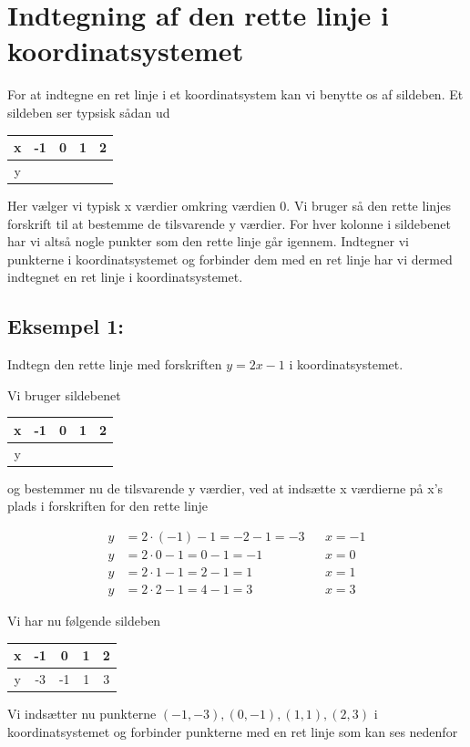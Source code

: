 \section*{Indtegning af den rette linje i koordinatsystemet}

For at indtegne en ret linje i et koordinatsystem kan vi benytte os af sildeben. Et sildeben ser typsisk sådan ud

\begin{tabular}{c|c|c|c|c}
x & -1 & 0 & 1 & 2 \\\hline
y &  & &   &  
\end{tabular}

Her vælger vi typisk x værdier omkring værdien 0. Vi bruger så den rette linjes forskrift til at bestemme de tilsvarende y værdier. For hver kolonne i sildebenet har vi altså nogle punkter som den rette linje går igennem. Indtegner vi punkterne i koordinatsystemet og forbinder dem med en ret linje har vi dermed indtegnet en ret linje i koordinatsystemet.

\subsection*{Eksempel 1:}

Indtegn den rette linje med forskriften $y = 2x - 1$ i koordinatsystemet.

Vi bruger sildebenet \begin{tabular}{c|c|c|c|c}
x & -1 & 0 & 1 & 2 \\\hline
y &  & &   &  
\end{tabular}

og bestemmer nu de tilsvarende y værdier, ved at indsætte x værdierne på x's plads i forskriften for den rette linje

\begin{align*}
y &= 2\cdot (-1) -1 = -2 -1 = -3 && x = -1\\
y &= 2 \cdot 0 - 1 = 0 - 1 = -1 && x = 0\\
y &= 2 \cdot 1 - 1 = 2 - 1 = 1 && x = 1\\
y &= 2 \cdot 2 - 1 = 4 - 1 = 3 && x = 3
\end{align*}

Vi har nu følgende sildeben

\begin{tabular}{c|c|c|c|c}
x & -1 & 0 & 1 & 2 \\\hline
y & -3 & -1 & 1 & 3 
\end{tabular}

Vi indsætter nu punkterne $(-1, -3), (0, -1), (1, 1), (2, 3)$ i koordinatsystemet og forbinder punkterne med en ret linje som kan ses nedenfor

